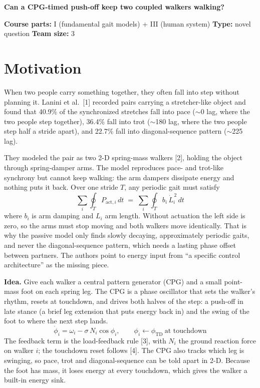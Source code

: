 \documentclass[11pt]{article}
\begin{document}
{\Large\bfseries Can a CPG-timed push-off keep two coupled walkers walking?}

\vspace{4pt}
\textbf{Course parts:} I (fundamental gait models) + III (human system) \textperiodcentered{}
\textbf{Type:} novel question \textperiodcentered{} \textbf{Team size:} 3

\section*{Motivation}

When two people carry something together, they often fall into step without planning it. Lanini et al.~[1] recorded pairs carrying a stretcher-like object and found that 40.9\% of the synchronized stretches fall into pace ($\sim$0\textdegree{} lag, where the two people step together), 36.4\% fall into trot ($\sim$180\textdegree{} lag, where the two people step half a stride apart), and 22.7\% fall into diagonal-sequence pattern ($\sim$225\textdegree{} lag).

They modeled the pair as two 2-D spring-mass walkers [2], holding the object through spring-damper arms. The model reproduces pace- and trot-like synchrony but cannot keep walking: the arm dampers dissipate energy and nothing puts it back. Over one stride $T$, any periodic gait must satisfy
\begin{equation*}
\sum_i \oint_T P_{\mathrm{act},i}\,dt \;=\; \sum_i \oint_T b_i\,\dot L_i^{\,2}\,dt
\end{equation*}
where $b_i$ is arm damping and $L_i$ arm length. Without actuation the left side is zero, so the arms must stop moving and both walkers move identically. That is why the passive model only finds slowly decaying, approximately periodic gaits, and never the diagonal-sequence pattern, which needs a lasting phase offset between partners. The authors point to energy input from ``a specific control architecture'' as the missing piece.

\textbf{Idea.} Give each walker a central pattern generator (CPG) and a small point-mass foot on each spring leg. The CPG is a phase oscillator that sets the walker's rhythm, resets at touchdown, and drives both halves of the step: a push-off in late stance (a brief leg extension that puts energy back in) and the swing of the foot to where the next step lands.
\begin{equation*}
\dot\phi_i = \omega_i - \sigma\,N_i\cos\phi_i, \qquad \phi_i \leftarrow \phi_{\mathrm{TD}} \ \text{at touchdown}
\end{equation*}
The feedback term is the load-feedback rule [3], with $N_i$ the ground reaction force on walker $i$; the touchdown reset follows [4]. The CPG also tracks which leg is swinging, so pace, trot and diagonal-sequence can be told apart in 2-D. Because the foot has mass, it loses energy at every touchdown, which gives the walker a built-in energy sink.
\end{document}
